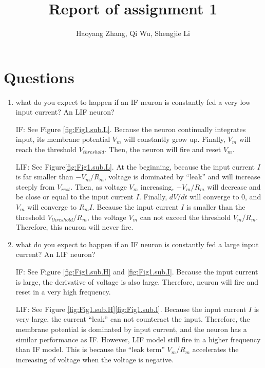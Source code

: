 \documentclass[11pt]{article}
\title{Report of assignment 1}
\author{Haoyang Zhang, Qi Wu, Shengjie Li}
\begin{document}
\maketitle

	\section*{Questions}
	\begin{enumerate}
		\item what do you expect to happen if an IF neuron is constantly fed a very low input current? An LIF neuron?
		
		IF: See Figure \ref{fig:Fig1.sub.L}. Because the neuron continually integrates input, its membrane potential $V_m$ will constantly grow up. Finally, $V_m$ will reach the threshold $V_{threshold}$. Then, the neuron will fire and reset $V_m$.
		
		LIF: See Figure\ref{fig:Fig1.sub.L}. At the beginning, because the input current $I$ is far smaller than $-V_m/R_m$, voltage is dominated by ``leak'' and will increase steeply from $V_{rest}$. Then, as voltage $V_m$ increasing, $-V_m/R_m$ will decrease and be close or equal to the input current $I$. Finally, $dV/dt$ will converge to 0, and $V_m$ will converge to $R_mI$. Because the input current $I$ is smaller than the threshold $V_{threshold}/R_m$, the voltage $V_m$ can not exceed the threshold $V_m/R_m$. Therefore, this neuron will never fire.
		
		\item what do you expect to happen if an IF neuron is constantly fed a large input current? An LIF neuron?
			
		IF: See Figure \ref{fig:Fig1.sub.H} and \ref{fig:Fig1.sub.I}. Because the input current is large, the derivative of voltage is also large. Therefore, neuron will fire and reset in a very high frequency.
		
		LIF: See Figure \ref{fig:Fig1.sub.H}\ref{fig:Fig1.sub.I}. Because the input current $I$ is very large, the current ``leak'' can not counteract the input. Therefore, the membrane potential is dominated by input current, and the neuron has a similar performance as IF. However, LIF model still fire in a higher frequency than IF model. This is because the ``leak term'' $V_m/R_m$ accelerates the increasing of voltage when the voltage is negative.
				

\end{enumerate}
\end{document}
